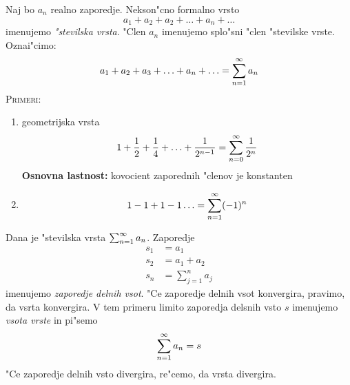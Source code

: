  Naj bo $a_n$ realno zaporedje. Nekson"cno formalno vrsto
\begin{equation*}
a_1 + a_2 + a_2 + \ldots + a_n + \ldots
\end{equation*}
imenujemo \emph{"stevilska vrsta}. "Clen $a_n$ imenujemo splo"sni "clen "stevilske vrste. Oznai"cimo:
\begin{equation*}
a_1 + a_2 + a_3 + \ldots + a_n + \ldots = \sum_{n = 1}^{\infty} a_n
\end{equation*}
\textsc{Primeri:}
\begin{enumerate}[1)]
	\item geometrijska vrsta
	\begin{equation*}
	1 + \dfrac{1}{2} + \dfrac{1}{4} + \ldots + \dfrac{1}{2^{n-1}} = \sum_{n = 0}^{\infty} \dfrac{1}{2^n}
	\end{equation*}
	\textbf{Osnovna lastnost:} kovocient zaporednih "clenov je konstanten
	
	\item 
	\begin{equation*}
	1 - 1 + 1 - 1 \ldots = \sum_{n = 1}^{\infty} (-1)^n
	\end{equation*}
\end{enumerate}
 Dana je "stevilska vrsta $\sum_{n = 1}^{\infty} a_n$. Zaporedje
\begin{align*}
s_1 &= a_1 \\
s_2 &= a_1 + a_2 \\
s_n &= \sum_{j = 1}^{n} a_j
\end{align*}
imenujemo \emph{zaporedje delnih vsot}. "Ce zaporedje delnih vsot konvergira, pravimo, da vsrta konvergira. V tem primeru limito zaporedja delsnih vsto $s$ imenujemo \emph{vsota vrste} in pi"semo
\begin{equation*}
\sum_{n = 1}^{\infty} a_n = s
\end{equation*}
"Ce zaporedje delnih vsto divergira, re"cemo, da vrsta divergira.

